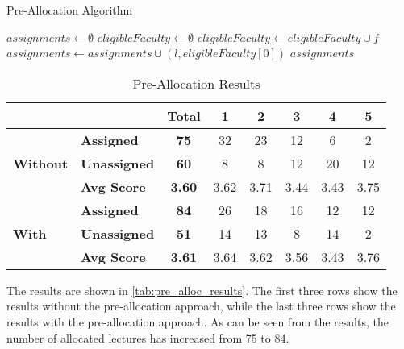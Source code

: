 \begin{algorithm}[H]
  \caption{Pre-Allocation Algorithm}
  \begin{algorithmic}[1]
    \State $assignments \gets \emptyset$
    \State $eligibleFaculty \gets \emptyset$
    \State $eligibleFaculty \gets eligibleFaculty \cup f$
    \EndIf
    \EndFor
    \State $assignments \gets assignments \cup (l, eligibleFaculty[0])$
    \EndIf
    \EndFor
    \State \Return $assignments$
    \EndProcedure
  \end{algorithmic}
  \label{alg:pre_allocation}
\end{algorithm}

\begin{table}[H]
  \centering
  \begin{tabular}{|l|l|c|c|c|c|c|c|}
    \hline
                     &                     & \textbf{Total} & \textbf{1} & \textbf{2} & \textbf{3} & \textbf{4} & \textbf{5} \\ \hline
                     & \textbf{Assigned}   & \textbf{75}    & 32         & 23         & 12         & 6          & 2          \\
    \textbf{Without} & \textbf{Unassigned} & \textbf{60}    & 8          & 8          & 12         & 20         & 12         \\
                     & \textbf{Avg Score}  & \textbf{3.60}  & 3.62       & 3.71       & 3.44       & 3.43       & 3.75       \\\hline
                     & \textbf{Assigned}   & \textbf{84}    & 26         & 18         & 16         & 12         & 12         \\
    \textbf{With}    & \textbf{Unassigned} & \textbf{51}    & 14         & 13         & 8          & 14         & 2          \\
                     & \textbf{Avg Score}  & \textbf{3.61}  & 3.64       & 3.62       & 3.56       & 3.43       & 3.76       \\
    \hline
  \end{tabular}
  \caption{Pre-Allocation Results}
  \label{tab:pre_alloc_results}
\end{table}

The results are shown in \autoref{tab:pre_alloc_results}. The first three rows show the results without the pre-allocation approach, while the last three rows show the results with the pre-allocation approach. As can be seen from the results, the number of allocated lectures has increased from 75 to 84.

